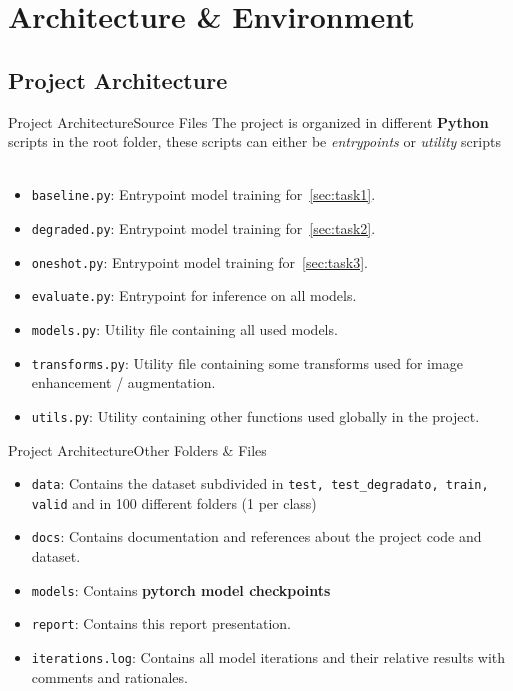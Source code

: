 \section{Architecture \& Environment}


\subsection{Project Architecture}
\begin{frame}{Project Architecture}{Source Files}
  The project is organized in different \textbf{Python} scripts in the root folder, these scripts can either be \textit{entrypoints} or \textit{utility} scripts
  \pause\

  \begin{itemize}
    \item \texttt{baseline.py}: Entrypoint model training for~\ref{sec:task1}.
    \item \texttt{degraded.py}: Entrypoint model training for~\ref{sec:task2}.
    \item \texttt{oneshot.py}: Entrypoint model training for~\ref{sec:task3}.
    \item \texttt{evaluate.py}: Entrypoint for inference on all models.\pause\
    \item \texttt{models.py}: Utility file containing all used models.
    \item \texttt{transforms.py}: Utility file containing some transforms used for image enhancement / augmentation.
    \item \texttt{utils.py}: Utility containing other functions used globally in the project.
  \end{itemize}
\end{frame}

\begin{frame}{Project Architecture}{Other Folders \& Files}
  \begin{itemize}
    \item \texttt{data}: Contains the dataset subdivided in \texttt{test, test\_degradato, train, valid} and in 100 different folders (1 per class)
    \item \texttt{docs}: Contains documentation and references about the project code and dataset.
    \item \texttt{models}: Contains \textbf{pytorch model checkpoints}
    \item \texttt{report}: Contains this report presentation.
    \item \texttt{iterations.log}: Contains all model iterations and their relative results with comments and rationales.
  \end{itemize}
\end{frame}

